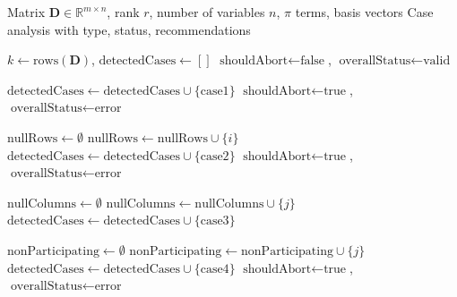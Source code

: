 \documentclass[
	11pt, %
	fleqn, %
	a4paper, %
]{LegrandOrangeBook}
\begin{document}
\begin{algorithm}[H]
\caption{Case Identification for Dimensional Analysis}
\begin{algorithmic}[1]
\Require Matrix $\mathbf{D} \in \mathbb{R}^{m \times n}$, rank $r$, number of variables $n$, $\pi$ terms, basis vectors
\Ensure Case analysis with type, status, recommendations

    \State $k \gets \text{rows}(\mathbf{D})$, $\text{detectedCases} \gets []$
    \State $\text{shouldAbort} \gets \text{false}$, $\text{overallStatus} \gets \text{valid}$ 

    \State {}
        \State $\text{detectedCases} \gets \text{detectedCases} \cup \{\text{case1}\}$
        \State $\text{shouldAbort} \gets \text{true}$, $\text{overallStatus} \gets \text{error}$ 
    \EndIf

        \State {}
    \State $\text{nullRows} \gets \emptyset$
            \State $\text{nullRows} \gets \text{nullRows} \cup \{i\}$
        \EndIf
    \EndFor
        \State $\text{detectedCases} \gets \text{detectedCases} \cup \{\text{case2}\}$
        \State $\text{shouldAbort} \gets \text{true}$, $\text{overallStatus} \gets \text{error}$ 
    \EndIf

    \State {}
    \State $\text{nullColumns} \gets \emptyset$
            \State $\text{nullColumns} \gets \text{nullColumns} \cup \{j\}$
        \EndIf
    \EndFor
        \State $\text{detectedCases} \gets \text{detectedCases} \cup \{\text{case3}\}$
    \EndIf


    \State {}
    \State $\text{nonParticipating} \gets \emptyset$
                \State $\text{nonParticipating} \gets \text{nonParticipating} \cup \{j\}$
            \EndIf
        \EndFor
    \EndIf
        \State $\text{detectedCases} \gets \text{detectedCases} \cup \{\text{case4}\}$
        \State $\text{shouldAbort} \gets \text{true}$, $\text{overallStatus} \gets \text{error}$ 
    \EndIf


\end{algorithmic}
\end{algorithm}
\end{document}

